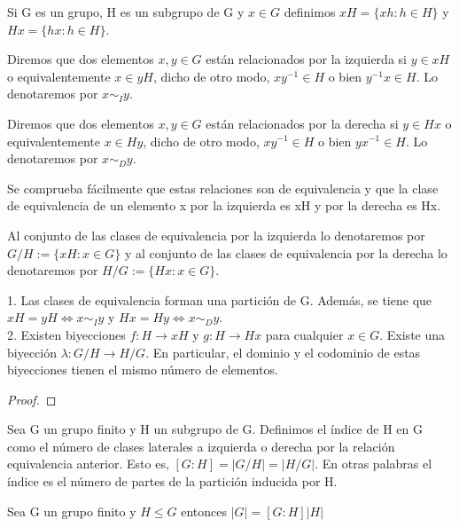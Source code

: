 \begin{ndef}
Si G es un grupo, H es un subgrupo de G y $x \in G$ definimos $xH = \{xh:h \in H\}$ y $Hx = \{hx:h \in H\}$.

Diremos que dos elementos $x,y \in G$ están relacionados por la izquierda si $y \in xH$ o equivalentemente $x \in yH$, dicho de otro modo, $xy^{-1} \in H$ o bien $y^{-1}x \in H$. Lo denotaremos por $x \sim_{I} y$.

Diremos que dos elementos $x,y \in G$ están relacionados por la derecha si $y \in Hx$ o equivalentemente $x \in Hy$, dicho de otro modo, $xy^{-1} \in H$ o bien $yx^{-1} \in H$. Lo denotaremos por $x \sim_{D} y$.

Se comprueba fácilmente que estas relaciones son de equivalencia y que la clase de equivalencia de un elemento x por la izquierda es xH y por la derecha es Hx.

Al conjunto de las clases de equivalencia por la izquierda lo denotaremos por $G/H := \{xH : x \in G \}$ y al conjunto de las clases de equivalencia por la derecha lo denotaremos por $H/G := \{Hx : x \in G \}$.
\end{ndef}

\begin{nprop}
1. Las clases de equivalencia forman una partición de G. Además, se tiene que $xH = yH \iff x \sim_{I} y$ y $Hx = Hy \iff x \sim_{D} y$. \\
2. Existen biyecciones $f:H \rightarrow xH$ y $g:H \rightarrow Hx$ para cualquier $x \in G$. Existe una biyección $\lambda:G/H \rightarrow H/G$. En particular, el dominio y el codominio de estas biyecciones tienen el mismo número de elementos.
\end{nprop}

\begin{proof}

\end{proof}

\begin{ndef}
Sea G un grupo finito y H un subgrupo de G. Definimos el índice de H en G como el número de clases laterales a izquierda o derecha por la relación equivalencia anterior. Esto es, $[G:H] = |G/H| = |H/G|$. En otras palabras el índice es el número de partes de la partición inducida por H.
\end{ndef}

\begin{nth}
Sea G un grupo finito y $H \le G$ entonces $|G| = [G:H]|H|$
\end{nth}

